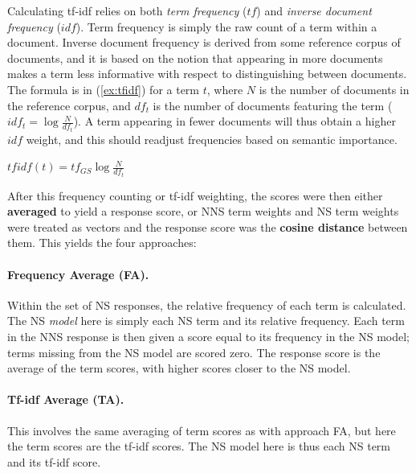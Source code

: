 Calculating tf-idf relies on both \emph{term frequency} ($tf$) and
\emph{inverse document frequency} ($idf$).  Term frequency is simply
the raw count of a term within a document. Inverse document frequency is derived from some reference corpus of documents, and it is based on the notion that appearing in more documents makes a term less informative with respect
to distinguishing between documents.  The formula is in
(\ref{ex:tfidf}) for a term $t$, where $N$ is the number of documents
in the reference corpus, and $df_{t}$ is the number of documents
featuring the term ($idf_{t} = \log \frac{N}{df_{t}}$).  A term
appearing in fewer documents will thus obtain a higher $idf$ weight,
and this should readjust frequencies based on semantic importance.

\begin{exe}
\ex\label{ex:tfidf} $tfidf(t) = tf_{GS} \log \frac{N}{df_{t}}$
\end{exe}

After this frequency counting or tf-idf weighting, the scores were then either
\textbf{averaged} to yield a response score, or NNS term
weights and NS term weights were treated as vectors and the response
score was the \textbf{cosine distance} between them.  This
yields the four approaches:

\paragraph{Frequency Average (FA).} 
Within the set of NS responses, the relative frequency of each term is calculated. The NS \textit{model} here is simply each NS term and its relative frequency. Each term in
the NNS response is then given a score equal to its frequency in the
NS model; terms missing from the NS model are scored zero. The response score is
the average of the term scores, with higher scores closer to the NS model.

\paragraph{Tf-idf Average (TA).} This involves the same
averaging of term scores as with approach FA, but here the term scores are the tf-idf scores. The NS model here is thus each NS term and its tf-idf score. 


